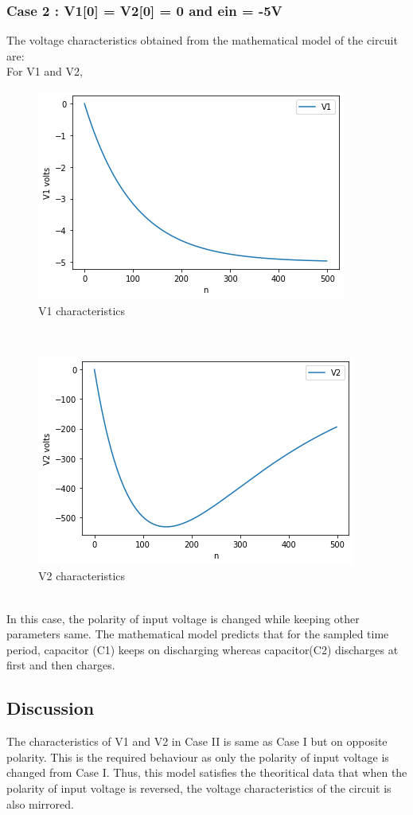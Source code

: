 \documentclass[10pt,journal,cspaper,compsoc]{IEEEtran}
\begin{document}
  \subsubsection*{Case 2 : V1[0] = V2[0] = 0 and ein = -5V}
  The voltage characteristics obtained from the mathematical model of the circuit are:\\
  For V1 and V2,\\
  \begin{figure}[ht]
    \centering
    \includegraphics[scale = 0.44]{images/Exp2_Example2_V1.png}
    \caption{V1 characteristics}
  \end{figure}
  \\
  \begin{figure}[h!]
    \centering
    \includegraphics[scale = 0.5]{images/Exp2_Example2_V2.png}
    \caption{V2 characteristics}
  \end{figure}
  \\In this case, the polarity of input voltage is changed while keeping other parameters same. The mathematical model predicts that for the sampled time period, capacitor (C1) keeps on discharging whereas capacitor(C2) discharges at first and then charges.
  \subsection{Discussion}
  The characteristics of V1 and V2 in Case II is same as Case I but on opposite polarity.
  This is the required behaviour as only the polarity of input voltage is changed from Case I.
  Thus, this model satisfies the theoritical data that when the polarity of input voltage is reversed,
  the voltage characteristics of the circuit is also mirrored.  
  
\end{document}

